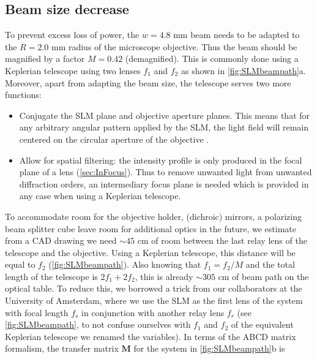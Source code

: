 \subsection{Beam size decrease}\label{sec:Demagnification}

To prevent excess loss of power, the $w = 4.8$ mm beam needs to be adapted to the $R = 2.0$ mm radius of the microscope objective. 
Thus the beam should be magnified by a factor $M=0.42$ (demagnified).
This is commonly done using a Keplerian telescope using two lenses $f_1$ and $f_2$ as shown in \ref{fig:SLMbeampath}a.
Moreover, apart from adapting the beam size, the telescope serves two more functions:

\begin{itemize}
    \item Conjugate the SLM plane and objective aperture planes.
    This means that for any arbitrary angular pattern applied by the SLM, the light field will remain centered on the circular aperture of the objective \cite{Nogrette2014}. 
    
    \item Allow for spatial filtering: the intensity profile is only produced in the focal plane of a lens (\cref{sec:InFocus}).
    Thus to remove unwanted light from unwanted diffraction orders, an intermediary focus plane is needed which is provided in any case when using a Keplerian telescope.
\end{itemize}
To accommodate room for the objective holder, (dichroic) mirrors, a polarizing beam splitter cube leave room for additional optics in the future, we estimate from a CAD drawing we need $\sim 45$ cm of room between the last relay lens of the telescope and the objective. 
Using a Keplerian telescope, this distance will be equal to $f_2$ (\cref{fig:SLMbeampath}).
Also knowing that $f_1=f_2/M$ and the total length of the telescope is $2f_1+2f_2$, this is already $\sim 305$ cm of beam path on the optical table. 
To reduce this, we borrowed a trick from our collaborators at the University of Amsterdam, where we use the SLM as the first lens of the system with focal length $f_s$ in conjunction with another relay lens $f_r$ (see \cref{fig:SLMbeampath}, to not confuse ourselves with $f_1$ and $f_2$ of the equivalent Keplerian telescope we renamed the variables). 
In terms of the ABCD matrix formalism, the transfer matrix $\mathbf{M}$ for the system in \cref{fig:SLMbeampath}b is

